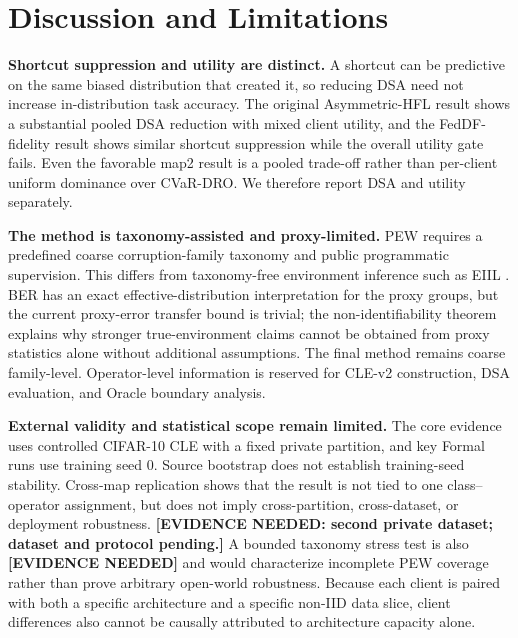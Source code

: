\section{Discussion and Limitations}

\textbf{Shortcut suppression and utility are distinct.} A shortcut can be predictive on the same biased distribution that created it, so reducing DSA need not increase in-distribution task accuracy. The original Asymmetric-HFL result shows a substantial pooled DSA reduction with mixed client utility, and the FedDF-fidelity result shows similar shortcut suppression while the overall utility gate fails. Even the favorable map2 result is a pooled trade-off rather than per-client uniform dominance over CVaR-DRO. We therefore report DSA and utility separately.

\textbf{The method is taxonomy-assisted and proxy-limited.} PEW requires a predefined coarse corruption-family taxonomy and public programmatic supervision. This differs from taxonomy-free environment inference such as EIIL \citep{creager2021eiil}. BER has an exact effective-distribution interpretation for the proxy groups, but the current proxy-error transfer bound is trivial; the non-identifiability theorem explains why stronger true-environment claims cannot be obtained from proxy statistics alone without additional assumptions. The final method remains coarse family-level. Operator-level information is reserved for CLE-v2 construction, DSA evaluation, and Oracle boundary analysis.

\textbf{External validity and statistical scope remain limited.} The core evidence uses controlled CIFAR-10 CLE with a fixed private partition, and key Formal runs use training seed 0. Source bootstrap does not establish training-seed stability. Cross-map replication shows that the result is not tied to one class--operator assignment, but does not imply cross-partition, cross-dataset, or deployment robustness. \textbf{[EVIDENCE NEEDED: second private dataset; dataset and protocol pending.]} A bounded taxonomy stress test is also \textbf{[EVIDENCE NEEDED]} and would characterize incomplete PEW coverage rather than prove arbitrary open-world robustness. Because each client is paired with both a specific architecture and a specific non-IID data slice, client differences also cannot be causally attributed to architecture capacity alone.
